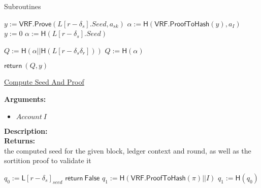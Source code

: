 \documentclass[10pt,a4paper]{article}
\begin{document}
\begin{section}{Subroutines}

\begin{algorithm}[H]\label{algo:compute-seed}
    \begin{algorithmic}[1]
             \State $y := \mathsf{VRF.Prove}(L[r-\delta_s].Seed, a_{sk})$
             \State $\alpha := \mathsf{H}(\mathsf{VRF.ProofToHash}(y), a_I)$
        \Else
            \State $y := 0$
            \State $\alpha := \mathsf{H}(L[r-\delta_s].Seed)$
        \EndIf

            \State $Q := \mathsf{H}(\alpha||\mathsf{H}(L[r-\delta_s\delta_r]))$
        \Else
            \State $Q := \mathsf{H}(\alpha)$
        \EndIf

         \State $\mathsf{return} \ (Q, y)$
    \EndFunction
    \end{algorithmic}
    \caption{\underline{Compute Seed And Proof}}
\end{algorithm}


\noindent \textbf{Arguments:}
\begin{itemize}
    \item $Account \ I$
  \end{itemize}


\noindent \textbf{Description:}\\ 


\noindent \textbf{Returns:} \\
    the computed seed for the given block, ledger context and round, as well as the sortition proof
    to validate it


\begin{algorithm}[H]\label{algo:verify-seed}
    \begin{algorithmic}[1]
        \State $q_0 := \mathsf{L}[r-\delta_s]_{seed}$
                    \State $\mathsf{return} \ \mathsf{False}$
                \EndIf
                \State $q_1 := \mathsf{H}(\mathsf{VRF.ProofToHash}(\pi)||I)$
            \Else
                \State $q_1 := \mathsf{H}(q_0)$
            \EndIf



\end{algorithmic}
\end{algorithm}
\end{section}
\end{document}
